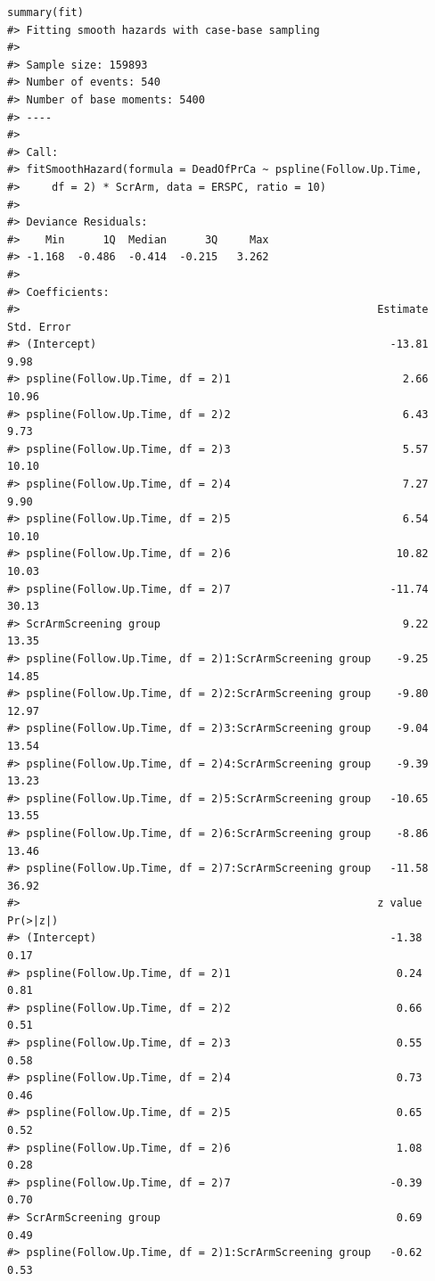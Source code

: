 \begin{verbatim}
summary(fit) 
#> Fitting smooth hazards with case-base sampling
#> 
#> Sample size: 159893 
#> Number of events: 540 
#> Number of base moments: 5400 
#> ----
#> 
#> Call:
#> fitSmoothHazard(formula = DeadOfPrCa ~ pspline(Follow.Up.Time, 
#>     df = 2) * ScrArm, data = ERSPC, ratio = 10)
#> 
#> Deviance Residuals: 
#>    Min      1Q  Median      3Q     Max  
#> -1.168  -0.486  -0.414  -0.215   3.262  
#> 
#> Coefficients:
#>                                                        Estimate Std. Error
#> (Intercept)                                              -13.81       9.98
#> pspline(Follow.Up.Time, df = 2)1                           2.66      10.96
#> pspline(Follow.Up.Time, df = 2)2                           6.43       9.73
#> pspline(Follow.Up.Time, df = 2)3                           5.57      10.10
#> pspline(Follow.Up.Time, df = 2)4                           7.27       9.90
#> pspline(Follow.Up.Time, df = 2)5                           6.54      10.10
#> pspline(Follow.Up.Time, df = 2)6                          10.82      10.03
#> pspline(Follow.Up.Time, df = 2)7                         -11.74      30.13
#> ScrArmScreening group                                      9.22      13.35
#> pspline(Follow.Up.Time, df = 2)1:ScrArmScreening group    -9.25      14.85
#> pspline(Follow.Up.Time, df = 2)2:ScrArmScreening group    -9.80      12.97
#> pspline(Follow.Up.Time, df = 2)3:ScrArmScreening group    -9.04      13.54
#> pspline(Follow.Up.Time, df = 2)4:ScrArmScreening group    -9.39      13.23
#> pspline(Follow.Up.Time, df = 2)5:ScrArmScreening group   -10.65      13.55
#> pspline(Follow.Up.Time, df = 2)6:ScrArmScreening group    -8.86      13.46
#> pspline(Follow.Up.Time, df = 2)7:ScrArmScreening group   -11.58      36.92
#>                                                        z value Pr(>|z|)
#> (Intercept)                                              -1.38     0.17
#> pspline(Follow.Up.Time, df = 2)1                          0.24     0.81
#> pspline(Follow.Up.Time, df = 2)2                          0.66     0.51
#> pspline(Follow.Up.Time, df = 2)3                          0.55     0.58
#> pspline(Follow.Up.Time, df = 2)4                          0.73     0.46
#> pspline(Follow.Up.Time, df = 2)5                          0.65     0.52
#> pspline(Follow.Up.Time, df = 2)6                          1.08     0.28
#> pspline(Follow.Up.Time, df = 2)7                         -0.39     0.70
#> ScrArmScreening group                                     0.69     0.49
#> pspline(Follow.Up.Time, df = 2)1:ScrArmScreening group   -0.62     0.53

\end{verbatim}

